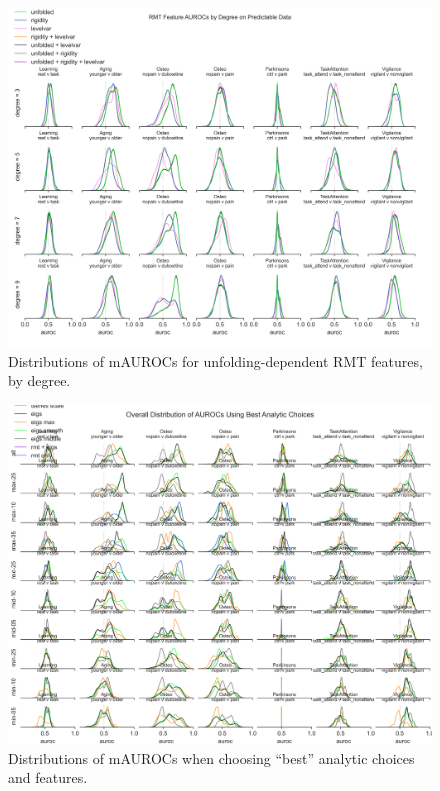 \documentclass{article}  %
\begin{document}
\begin{spacing}{1}
\begin{figure}
\begin{center}
\includegraphics[width=\textwidth,height=0.9\textheight,keepaspectratio]{rmt_feature_auroc_by_degree.png}
\end{center}
\caption
{ \label{fig:fine-degree}
Distributions of mAUROCs for unfolding-dependent RMT features, by degree.}
\end{figure}


\begin{figure}
\begin{center}
\includegraphics[width=\textwidth,height=0.9\textheight,keepaspectratio]{best_rmt_params_by_subgroup.png}
\end{center}
\caption
{ \label{fig:best-params}
Distributions of mAUROCs when choosing ``best'' analytic choices and features.}
\end{figure}



\end{spacing}
\end{document}
